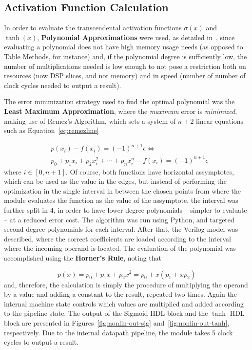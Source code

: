 \documentclass{IEEEtran}
\begin{document}
\subsection{Activation Function Calculation}\label{sec:proprarch_af}
In order to evaluate the transcendental activation functions $\sigma(x)$ and $\tanh(x)$, \textbf{Polynomial Approximations} were used, as detailed in~\cite{Muller05},
since evaluating a polynomial does not have high memory usage needs (as opposed to Table Methods, for instance) and, if the polynomial degree is sufficiently low, the
number of multiplications needed is low enough to not pose a restriction both on resources (now DSP slices, and not memory) and in speed (number of number of clock cycles
needed to output a result).

The error minimization strategy used to find the optimal polynomial was the \textbf{Least Maximum Approximation}, where
the \emph{maximum} error is \emph{minimized}, making use of Remez's Algorithm, which sets a system of $n+2$ linear equations such as Equation~\ref{eq:remezline}

\begin{eqnarray}\label{eq:remezline}
    & p(x_i) - f(x_i) = (-1)^{n+1} \epsilon \Leftrightarrow  \nonumber \\
		& p_0 + p_1 x_i + p_2 x_i^2 + \cdots + p_n x_i^n - f(x_i) = (-1)^{n+1} \epsilon
\end{eqnarray}
where $i \in \left[0, n+1\right]$. Of course, both functions have horizontal assymptotes, which can be used as the value in the edges,
but instead of performing the optimization in the single interval in between the chosen points from where the module evaluates the function
as the value of the assymptote, the interval was further split in 4, in order to have lower degree polynomials -- simpler to evaluate -- at a reduced error cost.
The algorithm was run using Python, and targeted second degree polynomials for each interval. After that, the Verilog model was described, where the correct
coefficients are loaded according to the interval where the incoming operand is located. The evaluation of the polynomial
was accomplished using the \textbf{Horner's Rule}, noting that

\begin{equation}\label{eq:factorPol}
p(x) = p_0 + p_1x + p_2x^2 = p_0 + x(p_1 + xp_2)
\end{equation}
and, therefore, the calculation is simply the procedure of multiplying the operand by a value and adding a constant to the result,
repeated two times. Again the internal machine state controls which values are multiplied and added according to the pipeline state.
The output of the Sigmoid HDL block  and the $\tanh$ HDL block are presented in Figures~\ref{fig:nonlin-out-sig}
and~\ref{fig:nonlin-out-tanh}, respectively. Due to the internal datapath pipeline, the module takes 5 clock cycles to output a result.
\end{document}
